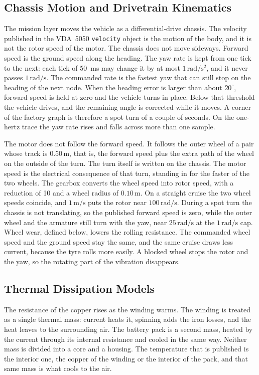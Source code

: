 \subsection{Chassis Motion and Drivetrain Kinematics}

The mission layer moves the vehicle as a differential-drive chassis. The velocity published in the VDA~5050 \texttt{velocity} object is the motion of the body, and it is not the rotor speed of the motor. The chassis does not move sideways. Forward speed is the ground speed along the heading. The yaw rate is kept from one tick to the next: each tick of 50~ms may change it by at most $1\,\mathrm{rad/s^2}$, and it never passes $1\,\mathrm{rad/s}$. The commanded rate is the fastest yaw that can still stop on the heading of the next node. When the heading error is larger than about $20^\circ$, forward speed is held at zero and the vehicle turns in place. Below that threshold the vehicle drives, and the remaining angle is corrected while it moves. A corner of the factory graph is therefore a spot turn of a couple of seconds. On the one-hertz trace the yaw rate rises and falls across more than one sample.

The motor does not follow the forward speed. It follows the outer wheel of a pair whose track is $0.50\,\mathrm{m}$, that is, the forward speed plus the extra path of the wheel on the outside of the turn. The turn itself is written on the chassis. The motor speed is the electrical consequence of that turn, standing in for the faster of the two wheels. The gearbox converts the wheel speed into rotor speed, with a reduction of 10 and a wheel radius of $0.10\,\mathrm{m}$. On a straight cruise the two wheel speeds coincide, and $1\,\mathrm{m/s}$ puts the rotor near $100\,\mathrm{rad/s}$. During a spot turn the chassis is not translating, so the published forward speed is zero, while the outer wheel and the armature still turn with the yaw, near $25\,\mathrm{rad/s}$ at the $1\,\mathrm{rad/s}$ cap. Wheel wear, defined below, lowers the rolling resistance. The commanded wheel speed and the ground speed stay the same, and the same cruise draws less current, because the tyre rolls more easily. A blocked wheel stops the rotor and the yaw, so the rotating part of the vibration disappears.

\subsection{Thermal Dissipation Models}

The resistance of the copper rises as the winding warms. The winding is treated as a single thermal mass: current heats it, spinning adds the iron losses, and the heat leaves to the surrounding air. The battery pack is a second mass, heated by the current through its internal resistance and cooled in the same way. Neither mass is divided into a core and a housing. The temperature that is published is the interior one, the copper of the winding or the interior of the pack, and that same mass is what cools to the air.

